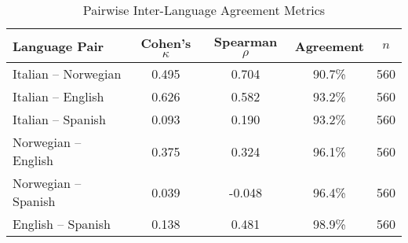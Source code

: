 
\begin{table}[htbp]
\centering
\caption{Pairwise Inter-Language Agreement Metrics}
\label{tab:pairwise_language_agreement}
\begin{tabular}{lcccc}
\toprule
Language Pair & Cohen's $\kappa$ & Spearman $\rho$ & Agreement & $n$ \\
\midrule
Italian -- Norwegian & 0.495 & 0.704 & 90.7\% & 560 \\
Italian -- English & 0.626 & 0.582 & 93.2\% & 560 \\
Italian -- Spanish & 0.093 & 0.190 & 93.2\% & 560 \\
Norwegian -- English & 0.375 & 0.324 & 96.1\% & 560 \\
Norwegian -- Spanish & 0.039 & -0.048 & 96.4\% & 560 \\
English -- Spanish & 0.138 & 0.481 & 98.9\% & 560 \\
\bottomrule
\end{tabular}
\end{table}